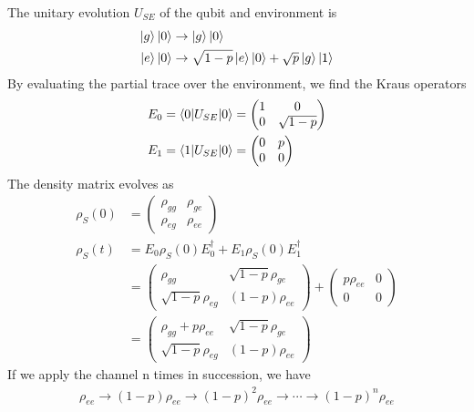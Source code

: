 The unitary evolution $U_{SE}$ of the qubit and environment is
\begin{align*}
    \ket{g}\ket{0}&\rightarrow\ket{g}\ket{0}\\
    \ket{e}\ket{0}&\rightarrow\sqrt{1-p}\ket{e}\ket{0}+\sqrt{p}\ket{g}\ket{1}
\end{align*}
By evaluating the partial trace over the environment, we find the Kraus operators
\begin{align*}
    E_0&=\braket{0|U_{SE}|0}=\begin{pmatrix}
        1 & 0 \\ 0 & \sqrt{1-p}
    \end{pmatrix}\\
    E_1&=\braket{1|U_{SE}|0}=\begin{pmatrix}
        0 & p \\ 0 & 0 
    \end{pmatrix}
\end{align*}
The density matrix evolves as
\begin{align*}
    \rho_S(0)&=\begin{pmatrix}
        \rho_{gg} & \rho_{ge}\\ \rho_{eg} & \rho_{ee}
    \end{pmatrix}\\
    \rho_S(t)&=E_0\rho_S(0)E_0^\dagger+E_1\rho_S(0)E_1^\dagger\\
    &=\begin{pmatrix}
        \rho_{gg} & \sqrt{1-p}\rho_{ge}\\ \sqrt{1-p}\rho_{eg}& (1-p)\rho_{ee}
    \end{pmatrix}+\begin{pmatrix}
        p\rho_{ee} & 0 \\ 0 & 0
    \end{pmatrix}\\
    &=\begin{pmatrix}
        \rho_{gg}+p\rho_{ee} & \sqrt{1-p}\rho_{ge}\\ \sqrt{1-p}\rho_{eg}& (1-p)\rho_{ee}
    \end{pmatrix}
\end{align*}
If we apply the channel n times in succession, we have
\begin{align*}
    \rho_{ee}\rightarrow(1-p)\rho_{ee}\rightarrow(1-p)^2\rho_{ee}\rightarrow\cdots\rightarrow(1-p)^n\rho_{ee}
\end{align*}

